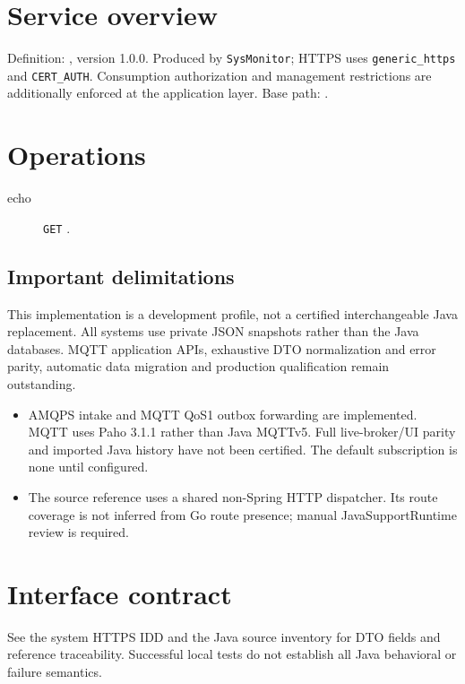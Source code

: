 \documentclass[a4paper]{arrowhead}
\begin{document}
\ArrowheadSetup
\section{Service overview}
Definition: , version 1.0.0. Produced by \texttt{SysMonitor}; HTTPS uses \texttt{generic\_https} and \texttt{CERT\_AUTH}. Consumption authorization and management restrictions are additionally enforced at the application layer. Base path: .
\section{Operations}
\begin{description}
\item[echo] \texttt{GET} .
\end{description}
\subsection{Important delimitations}
This implementation is a development profile, not a certified interchangeable Java replacement. All systems use private JSON snapshots rather than the Java databases. MQTT application APIs, exhaustive DTO normalization and error parity, automatic data migration and production qualification remain outstanding.
\begin{itemize}
\item AMQPS intake and MQTT QoS1 outbox forwarding are implemented. MQTT uses Paho 3.1.1 rather than Java MQTTv5. Full live-broker/UI parity and imported Java history have not been certified. The default subscription is none until configured.
\item The source reference uses a shared non-Spring HTTP dispatcher. Its route coverage is not inferred from Go route presence; manual JavaSupportRuntime review is required.
\end{itemize}
\section{Interface contract}
See the system HTTPS IDD and the Java source inventory for DTO fields and reference traceability. Successful local tests do not establish all Java behavioral or failure semantics.
\end{document}
